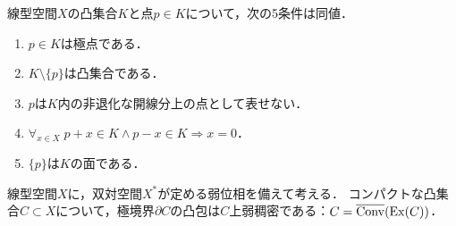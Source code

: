 \documentclass[uplatex,dvipdfmx]{jsreport}
\begin{document}
\begin{proposition}[極点の特徴付け]
    線型空間$X$の凸集合$K$と点$p\in K$について，次の5条件は同値．
    \begin{enumerate}
        \item $p\in K$は極点である．
        \item $K\setminus\{p\}$は凸集合である．
        \item $p$は$K$内の非退化な開線分上の点として表せない．
        \item $\forall_{x\in X}\;p+x\in K\land p-x\in K\Rightarrow x=0$．
        \item $\{p\}$は$K$の面である．
    \end{enumerate}
\end{proposition}

\begin{theorem}
    線型空間$X$に，双対空間$X^*$が定める弱位相を備えて考える．
    コンパクトな凸集合$C\subset X$について，極境界$\partial C$の凸包は$C$上弱稠密である：$C=\overline{\mathrm{Conv}}(\mathrm{Ex}(C))$．
\end{theorem}
\end{document}
